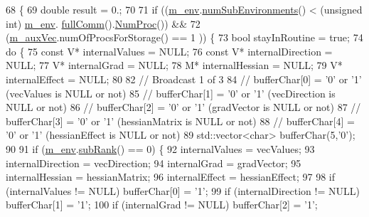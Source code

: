 \begin{DoxyCode}
68 \{
69   \textcolor{keywordtype}{double} result = 0.;
70 
71   \textcolor{keywordflow}{if} ((\hyperlink{class_q_u_e_s_o_1_1_scalar_function_synchronizer_aa77a3d3b53267ef7c731836faaa082fb}{m\_env}.\hyperlink{class_q_u_e_s_o_1_1_base_environment_ac0345f57e31ef7833e379ed972bd094d}{numSubEnvironments}() < (\textcolor{keywordtype}{unsigned} int) \hyperlink{class_q_u_e_s_o_1_1_scalar_function_synchronizer_aa77a3d3b53267ef7c731836faaa082fb}{m\_env}.
      \hyperlink{class_q_u_e_s_o_1_1_base_environment_a0b0779b41ff304058856e97e1d16b4d4}{fullComm}().\hyperlink{class_q_u_e_s_o_1_1_mpi_comm_aa780721ae0fdeabc5a15e04cb0cad964}{NumProc}()) &&
72       (\hyperlink{class_q_u_e_s_o_1_1_scalar_function_synchronizer_adbd43aee6de557012924f3e18660a4f3}{m\_auxVec}.numOfProcsForStorage() == 1                                  )) \{
73     \textcolor{keywordtype}{bool} stayInRoutine = \textcolor{keyword}{true};
74     \textcolor{keywordflow}{do} \{
75       \textcolor{keyword}{const} V* internalValues    = NULL;
76       \textcolor{keyword}{const} V* internalDirection = NULL;
77             V* internalGrad      = NULL;
78             M* internalHessian   = NULL;
79             V* internalEffect    = NULL;
80 
82       \textcolor{comment}{// Broadcast 1 of 3}
84 \textcolor{comment}{}      \textcolor{comment}{// bufferChar[0] = '0' or '1' (vecValues     is NULL or not)}
85       \textcolor{comment}{// bufferChar[1] = '0' or '1' (vecDirection  is NULL or not)}
86       \textcolor{comment}{// bufferChar[2] = '0' or '1' (gradVector    is NULL or not)}
87       \textcolor{comment}{// bufferChar[3] = '0' or '1' (hessianMatrix is NULL or not)}
88       \textcolor{comment}{// bufferChar[4] = '0' or '1' (hessianEffect is NULL or not)}
89       std::vector<char> bufferChar(5,\textcolor{charliteral}{'0'});
90 
91       \textcolor{keywordflow}{if} (\hyperlink{class_q_u_e_s_o_1_1_scalar_function_synchronizer_aa77a3d3b53267ef7c731836faaa082fb}{m\_env}.\hyperlink{class_q_u_e_s_o_1_1_base_environment_a172d52f993f1322ed45aaddf71518dbb}{subRank}() == 0) \{
92         internalValues    = vecValues;
93         internalDirection = vecDirection;
94         internalGrad      = gradVector;
95         internalHessian   = hessianMatrix;
96         internalEffect    = hessianEffect;
97 
98         \textcolor{keywordflow}{if} (internalValues    != NULL) bufferChar[0] = \textcolor{charliteral}{'1'};
99         \textcolor{keywordflow}{if} (internalDirection != NULL) bufferChar[1] = \textcolor{charliteral}{'1'};
100         \textcolor{keywordflow}{if} (internalGrad      != NULL) bufferChar[2] = \textcolor{charliteral}{'1'};

\end{DoxyCode}
